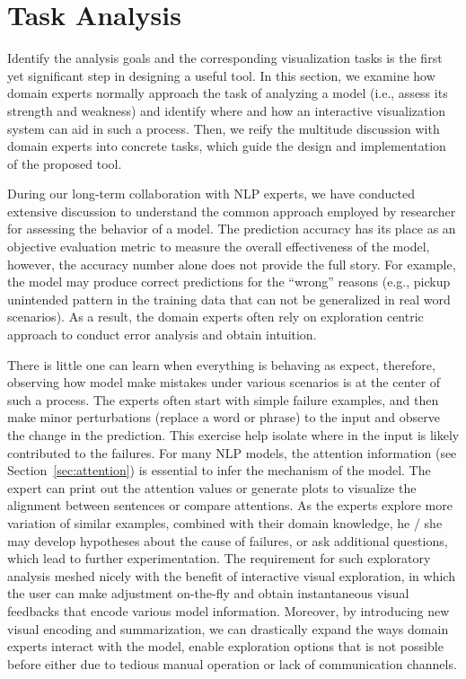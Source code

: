\section{Task Analysis}
\label{sec:task}
Identify the analysis goals and the corresponding visualization tasks is the first yet significant step in designing a useful tool. In this section, we examine how domain experts normally approach the task of analyzing a model (i.e., assess its strength and weakness) and identify where and how an interactive visualization system can aid in such a process.
Then, we reify the multitude discussion with domain experts into concrete tasks, which guide the design and implementation of the proposed tool.

During our long-term collaboration with NLP experts, we have conducted extensive discussion to understand the common approach employed by researcher for assessing the behavior of a model.%
The prediction accuracy has its place as an objective evaluation metric to measure the overall effectiveness of the model, however, the accuracy number alone does not provide the full story.
For example, the model may produce correct predictions for the ``wrong'' reasons (e.g., pickup unintended pattern in the training data that can not be generalized in real word scenarios).
%
As a result, the domain experts often rely on exploration centric approach to
conduct error analysis and obtain intuition.

There is little one can learn when everything is behaving as expect, therefore,
observing how model make mistakes under various scenarios is at the center of such a process.
The experts often start with simple failure examples, and then make minor perturbations (replace a word or phrase) to the input and observe the change in the prediction. This exercise help isolate where in the input is likely contributed to the failures. For many NLP models, the attention information (see Section~\ref{sec:attention}) is essential to infer the mechanism of the model. The expert can print out the attention values or generate plots to visualize the alignment between sentences or compare attentions. As the experts explore more variation of similar examples, combined with their domain knowledge, he / she may develop hypotheses about the cause of failures, or ask additional questions, which lead to further experimentation.
%
The requirement for such exploratory analysis meshed nicely with the benefit of interactive visual exploration, in which the user can make adjustment on-the-fly and obtain instantaneous visual feedbacks that encode various model information.
%
Moreover, by introducing new visual encoding and summarization, we can drastically expand the ways domain experts interact with the model, enable exploration options that is not possible before either due to tedious manual operation or lack of communication channels.

